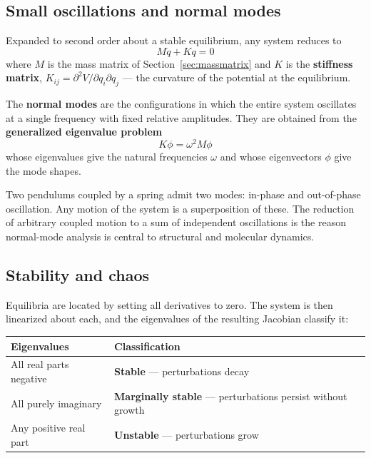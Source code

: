 \documentclass[11pt,a4paper]{article}
\begin{document}
\subsection{Small oscillations and normal modes}

Expanded to second order about a stable equilibrium, any system reduces to
\begin{equation}
M\ddot q + Kq = 0
\end{equation}
where $M$ is the mass matrix of Section~\ref{sec:massmatrix} and $K$ is the \textbf{stiffness
matrix}, $K_{ij} = \partial^2 V/\partial q_i \partial q_j$ --- the curvature of the potential at the
equilibrium.

The \textbf{normal modes} are the configurations in which the entire system oscillates at a single
frequency with fixed relative amplitudes. They are obtained from the \textbf{generalized eigenvalue
problem}
\begin{equation}
K\phi = \omega^2 M \phi
\end{equation}
whose eigenvalues give the natural frequencies $\omega$ and whose eigenvectors $\phi$ give the mode
shapes.

Two pendulums coupled by a spring admit two modes: in-phase and out-of-phase oscillation. Any motion
of the system is a superposition of these. The reduction of arbitrary coupled motion to a sum of
independent oscillations is the reason normal-mode analysis is central to structural and molecular
dynamics.

\subsection{Stability and chaos}

Equilibria are located by setting all derivatives to zero. The system is then linearized about each,
and the eigenvalues of the resulting Jacobian classify it:

\begin{center}
\begin{tabular}{@{}L{6.2cm}L{6.4cm}@{}}
\toprule
\textbf{Eigenvalues} & \textbf{Classification} \\
\midrule
All real parts negative & \textbf{Stable} --- perturbations decay \\
All purely imaginary    & \textbf{Marginally stable} --- perturbations persist without growth \\
Any positive real part  & \textbf{Unstable} --- perturbations grow \\
\bottomrule
\end{tabular}
\end{center}
\end{document}
